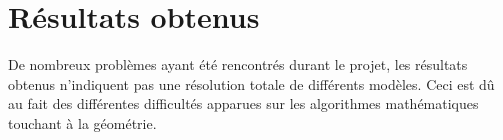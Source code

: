 \documentclass[a4paper, 11pt]{report}
\begin{document}
	\chapter{Résultats obtenus}
	
	De nombreux problèmes ayant été rencontrés durant le projet, les résultats obtenus n'indiquent pas une résolution totale de différents modèles. Ceci est d\^u au fait des différentes difficultés apparues sur les algorithmes mathématiques touchant à la géométrie.
	
	
		
	\newpage	
		
	\tableofcontents
		
\end{document}
